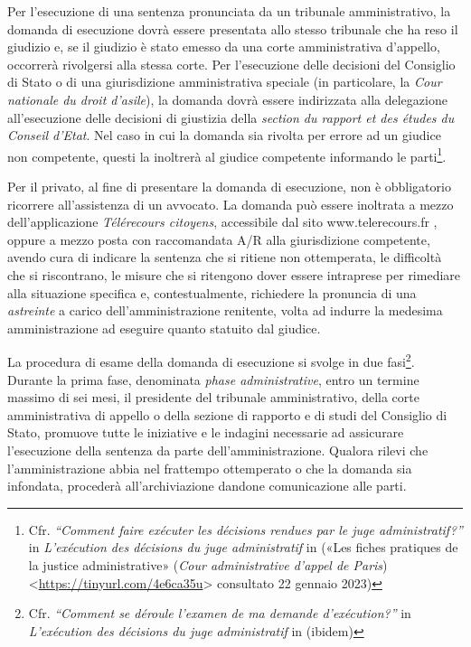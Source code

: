 \documentclass[12pt,it,a4paper,]{report}
\begin{document}
Per l'esecuzione di una sentenza pronunciata da un tribunale
amministrativo, la domanda di esecuzione dovrà essere presentata allo
stesso tribunale che ha reso il giudizio e, se il giudizio è stato
emesso da una corte amministrativa d'appello, occorrerà rivolgersi alla
stessa corte. Per l'esecuzione delle decisioni del Consiglio di Stato o
di una giurisdizione amministrativa speciale (in particolare, la
\emph{Cour nationale du droit d'asile}), la domanda dovrà essere
indirizzata alla delegazione all'esecuzione delle decisioni di giustizia
della \emph{section du rapport et des études du Conseil d'Etat}. Nel
caso in cui la domanda sia rivolta per errore ad un giudice non
competente, questi la inoltrerà al giudice competente informando le
parti\footnote{Cfr. \emph{``Comment faire exécuter les décisions rendues
  par le juge administratif?''} in \emph{L'exécution des décisions du
  juge administratif} in ({«Les fiches pratiques de la justice
  administrative»} (\emph{Cour administrative d'appel de Paris})
  \textless{}\url{https://tinyurl.com/4e6ca35u}\textgreater{} consultato
  22 gennaio 2023)}.

Per il privato, al fine di presentare la domanda di esecuzione, non è
obbligatorio ricorrere all'assistenza di un avvocato. La domanda può
essere inoltrata a mezzo dell'applicazione \emph{Télérecours citoyens},
accessibile dal sito www.telerecours.fr , oppure a mezzo posta con
raccomandata A/R alla giurisdizione competente, avendo cura di indicare
la sentenza che si ritiene non ottemperata, le difficoltà che si
riscontrano, le misure che si ritengono dover essere intraprese per
rimediare alla situazione specifica e, contestualmente, richiedere la
pronuncia di una \emph{astreinte} a carico dell'amministrazione
renitente, volta ad indurre la medesima amministrazione ad eseguire
quanto statuito dal giudice.

La procedura di esame della domanda di esecuzione si svolge in due
fasi\footnote{Cfr. \emph{``Comment se déroule l'examen de ma demande
  d'exécution?''} in \emph{L'exécution des décisions du juge
  administratif} in (ibidem)}. Durante la prima fase, denominata
\emph{phase administrative}, entro un termine massimo di sei mesi, il
presidente del tribunale amministrativo, della corte amministrativa di
appello o della sezione di rapporto e di studi del Consiglio di Stato,
promuove tutte le iniziative e le indagini necessarie ad assicurare
l'esecuzione della sentenza da parte dell'amministrazione. Qualora
rilevi che l'amministrazione abbia nel frattempo ottemperato o che la
domanda sia infondata, procederà all'archiviazione dandone comunicazione
alle parti.
\end{document}
